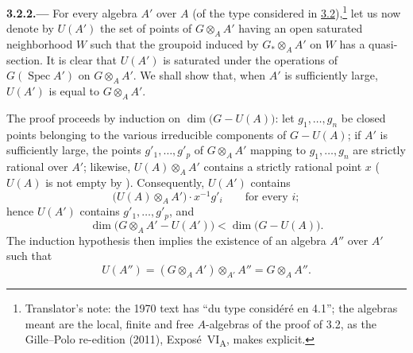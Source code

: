 
\medskip
{}\label{par:sga3-VIA-3.2.2}%
\noindent\textbf{3.2.2.---}
For every algebra \(A'\) over \(A\) (of the type considered in \hyperref[thm:sga3-VIA-3.2]{3.2}),\footnote{Translator's note: the 1970 text has ``du type considéré en
4.1''; the algebras meant are the local, finite and free \(A\)-algebras of the proof of 3.2, as the
Gille--Polo re-edition (2011), Exposé~VI\textsubscript{A}, makes explicit.}
let us now denote by \(U(A')\) the set of points of \(G\otimes_AA'\) having an
open saturated neighborhood \(W\) such that the groupoid induced by
\(G_*\otimes_AA'\) on \(W\) has a quasi-section. It is clear that
\(U(A')\) is saturated under the operations of
\(G(\operatorname{Spec}A')\) on \(G\otimes_AA'\). We shall show that,
when \(A'\) is sufficiently large, \(U(A')\) is equal to \(G\otimes_AA'\).

The proof proceeds by induction on \(\dim\bigl(G-U(A)\bigr)\): let
\(g_1,\ldots,g_n\) be closed points belonging to the various irreducible
components of \(G-U(A)\); if \(A'\) is sufficiently large, the points
\(g'_1,\ldots,g'_p\) of \(G\otimes_AA'\) mapping to \(g_1,\ldots,g_n\) are
strictly rational over \(A'\); likewise, \(U(A)\otimes_AA'\) contains a strictly
rational point \(x\) (\(U(A)\) is not empty by
). Consequently, \(U(A')\) contains
\[
  \bigl(U(A)\otimes_AA'\bigr)\cdot x^{-1}g'_i
  \qquad\text{for every }i;
\]
hence \(U(A')\) contains \(g'_1,\ldots,g'_p\), and
\[
  \dim\bigl(G\otimes_AA'-U(A')\bigr)
  <
  \dim\bigl(G-U(A)\bigr).
\]
The induction hypothesis then implies the existence of an algebra \(A''\)
over \(A'\) such that
\[
  U(A'')
  =
  (G\otimes_AA')\otimes_{A'}A''
  =
  G\otimes_AA''.
\]
